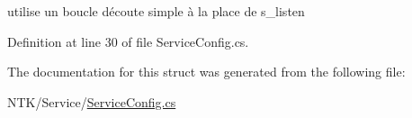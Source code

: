 utilise un boucle d\textquotesingle{}écoute simple à la place de s\+\_\+listen 



Definition at line 30 of file Service\+Config.\+cs.



The documentation for this struct was generated from the following file\+:\begin{DoxyCompactItemize}
\item 
N\+T\+K/\+Service/\mbox{\hyperlink{_service_config_8cs}{Service\+Config.\+cs}}\end{DoxyCompactItemize}
